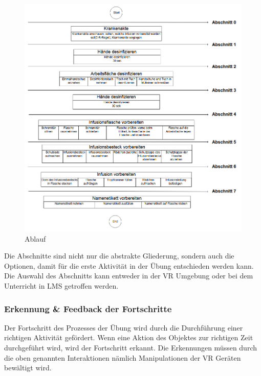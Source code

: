   \begin{figure}[ht]
  \begin{minipage}[t]{1\linewidth}
  \centering
  \includegraphics[width=\textwidth]{images/AblaufInfusionsvorbereitung.png}
  \caption[Skillslab WebVR]{Ablauf}
  \end{minipage}
  \end{figure}
  
  Die Abschnitte sind nicht nur die abstrakte Gliederung, sondern auch die Optionen, damit für die erste Aktivität in der Übung entschieden werden kann. Die Auswahl des Abschnitts kann entweder in der VR Umgebung oder bei dem Unterricht in LMS getroffen werden.
  
  \subsubsection{Erkennung \& Feedback der Fortschritte}
  Der Fortschritt des Prozesses der Übung wird durch die Durchführung einer richtigen Aktivität gefördert. Wenn eine Aktion des Objektes zur richtigen Zeit durchgeführt wird, wird der Fortschritt erkannt. Die Erkennungen müssen durch die oben genannten Interaktionen nämlich Manipulationen der VR Geräten bewältigt wird. %
  
